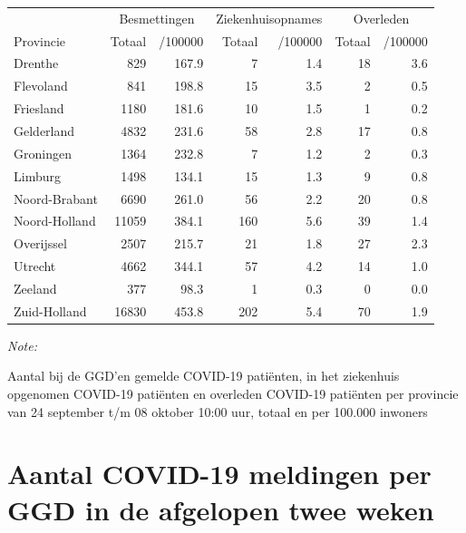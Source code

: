 \documentclass[
  english,
  man,floatsintext]{apa6}
\begin{document}
\begin{table}[H]
\centering
\begin{threeparttable}
\begin{tabular}{lrrrrrr}
\toprule
\multicolumn{1}{c}{ } & \multicolumn{2}{c}{Besmettingen} & \multicolumn{2}{c}{Ziekenhuisopnames} & \multicolumn{2}{c}{Overleden} \\
\cmidrule(l{3pt}r{3pt}){2-3} \cmidrule(l{3pt}r{3pt}){4-5} \cmidrule(l{3pt}r{3pt}){6-7}
Provincie & Totaal & /100000 & Totaal & /100000 & Totaal & /100000\\
\midrule
Drenthe & 829 & 167.9 & 7 & 1.4 & 18 & 3.6\\
Flevoland & 841 & 198.8 & 15 & 3.5 & 2 & 0.5\\
Friesland & 1180 & 181.6 & 10 & 1.5 & 1 & 0.2\\
Gelderland & 4832 & 231.6 & 58 & 2.8 & 17 & 0.8\\
Groningen & 1364 & 232.8 & 7 & 1.2 & 2 & 0.3\\
Limburg & 1498 & 134.1 & 15 & 1.3 & 9 & 0.8\\
Noord-Brabant & 6690 & 261.0 & 56 & 2.2 & 20 & 0.8\\
Noord-Holland & 11059 & 384.1 & 160 & 5.6 & 39 & 1.4\\
Overijssel & 2507 & 215.7 & 21 & 1.8 & 27 & 2.3\\
Utrecht & 4662 & 344.1 & 57 & 4.2 & 14 & 1.0\\
Zeeland & 377 & 98.3 & 1 & 0.3 & 0 & 0.0\\
Zuid-Holland & 16830 & 453.8 & 202 & 5.4 & 70 & 1.9\\
\bottomrule
\end{tabular}
\begin{tablenotes}
\item \textit{Note: } 
\item Aantal bij de GGD’en gemelde COVID-19 patiënten, in het ziekenhuis opgenomen COVID-19 patiënten en overleden COVID-19 patiënten per provincie van 24 september t/m 08 oktober 10:00 uur, totaal en per 100.000 inwoners
\end{tablenotes}
\end{threeparttable}
\end{table}

\newpage

\hypertarget{aantal-covid-19-meldingen-per-ggd-in-de-afgelopen-twee-weken}{%
\section{Aantal COVID-19 meldingen per GGD in de afgelopen twee weken}\label{aantal-covid-19-meldingen-per-ggd-in-de-afgelopen-twee-weken}}
\end{document}
